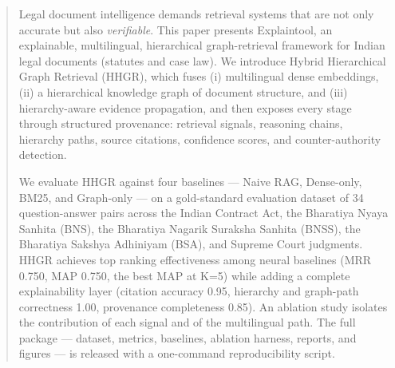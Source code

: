 \begin{abstract}
Legal document intelligence demands retrieval systems that are not only
accurate but also \emph{verifiable}. This paper presents Explaintool, an
explainable, multilingual, hierarchical graph-retrieval framework for Indian
legal documents (statutes and case law). We introduce Hybrid Hierarchical
Graph Retrieval (HHGR), which fuses (i) multilingual dense embeddings, (ii) a
hierarchical knowledge graph of document structure, and (iii) hierarchy-aware
evidence propagation, and then exposes every stage through structured
provenance: retrieval signals, reasoning chains, hierarchy paths, source
citations, confidence scores, and counter-authority detection.

We evaluate HHGR against four baselines --- Naive RAG, Dense-only, BM25, and
Graph-only --- on a gold-standard evaluation dataset of 34 question-answer
pairs across the Indian Contract Act, the Bharatiya Nyaya Sanhita (BNS), the
Bharatiya Nagarik Suraksha Sanhita (BNSS), the Bharatiya Sakshya Adhiniyam
(BSA), and Supreme Court judgments. HHGR achieves top ranking effectiveness
among neural baselines (MRR 0.750, MAP 0.750, the best MAP at K=5) while
adding a complete explainability layer (citation accuracy 0.95, hierarchy and
graph-path correctness 1.00, provenance completeness 0.85). An ablation study
isolates the contribution of each signal and of the multilingual path. The
full package --- dataset, metrics, baselines, ablation harness, reports, and
figures --- is released with a one-command reproducibility script.
\end{abstract}
